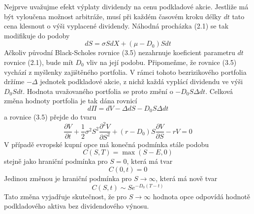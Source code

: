 \documentclass[a4paper]{book}
\begin{document}
Nejprve uvažujme efekt výplaty dividendy na cenu podkladové akcie. Jestliže má být vyloučena možnost arbitráže, musí při každém časovém kroku délky $dt$ tato cena klesnout o výši vyplacené dividendy. Náhodná procházka (2.1) se tak modifikuje do podoby
\begin{equation}
dS = \sigma S dX + (\mu - D_0)S dt
\end{equation}
Ačkoliv původní Black-Scholes rovnice (3.5) nezahrnuje koeficient parametru $dt$ rovnice (2.1), bude mít $D_0$ vliv na její podobu. Připomeňme, že rovnice (3.5) vychází z myšlenky zajištěného portfolia. V rámci tohoto bezrizikového portfolia držíme $-\Delta$ jednotek podkladové akcie, z nichž každá vyplácí dividendu ve výši $D_0 S dt$. Hodnota uvažovaného portfolia se proto změní o $-D_0 S \Delta dt$. Celková změna hodnoty portfolia je tak dána rovnicí
\begin{equation*}
d\Pi = dV - \Delta dS - D_0 S \Delta dt
\end{equation*}
a rovnice (3.5) přejde do tvaru
\begin{equation}
\frac{\partial V}{\partial t} + \frac{1}{2} \sigma^2 S^2 \frac{\partial^2 V}{\partial S^2} + (r - D_0)S \frac{\partial V}{\partial S} - rV = 0
\end{equation}
V případě evropské kupní opce má konečná podmínka stále podobu
\begin{equation*}
C(S,T) = \max(S - E, 0)
\end{equation*}
stejně jako hraniční podmínka pro $S = 0$, která má tvar
\begin{equation*}
C(0,t) = 0
\end{equation*}
Jedinou změnou je hraniční podmínka pro $S \rightarrow \infty$, která má nově tvar
\begin{equation*}
C(S,t) \sim Se^{-D_0(T - t)}
\end{equation*}
Tato změna vyjadřuje skutečnost, že pro $S \rightarrow \infty$ hodnota opce odpovídá hodnotě podkladového aktiva bez dividendového výnosu.
\end{document}
